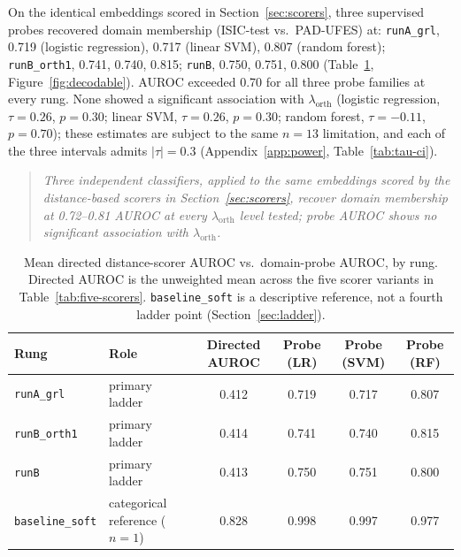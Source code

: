 On the identical embeddings scored in Section~\ref{sec:scorers}, three supervised probes recovered domain membership (ISIC-test vs.\ PAD-UFES) at: \texttt{runA\_grl}, 0.719 (logistic regression), 0.717 (linear SVM), 0.807 (random forest); \texttt{runB\_orth1}, 0.741, 0.740, 0.815; \texttt{runB}, 0.750, 0.751, 0.800 (Table~\ref{tab:probe-vs-distance}, Figure~\ref{fig:decodable}). AUROC exceeded 0.70 for all three probe families at every rung. None showed a significant association with $\lambda_{\mathrm{orth}}$ (logistic regression, $\tau = 0.26$, $p = 0.30$; linear SVM, $\tau = 0.26$, $p = 0.30$; random forest, $\tau = -0.11$, $p = 0.70$); these estimates are subject to the same $n = 13$ limitation, and each of the three intervals admits $|\tau| = 0.3$ (Appendix~\ref{app:power}, Table~\ref{tab:tau-ci}).

\begin{quote}
\emph{Three independent classifiers, applied to the same embeddings scored by the distance-based scorers in Section~\ref{sec:scorers}, recover domain membership at 0.72--0.81 AUROC at every $\lambda_{\mathrm{orth}}$ level tested; probe AUROC shows no significant association with $\lambda_{\mathrm{orth}}$.}
\end{quote}

\begin{table}[t]
\centering
\caption{Mean directed distance-scorer AUROC vs.\ domain-probe AUROC, by rung. Directed AUROC is the unweighted mean across the five scorer variants in Table~\ref{tab:five-scorers}. \texttt{baseline\_soft} is a descriptive reference, not a fourth ladder point (Section~\ref{sec:ladder}).}
\label{tab:probe-vs-distance}
\small
\begin{tabular}{llcccc}
\toprule
Rung & Role & Directed AUROC & Probe (LR) & Probe (SVM) & Probe (RF) \\
\midrule
\texttt{runA\_grl} & primary ladder & 0.412 & 0.719 & 0.717 & 0.807 \\
\texttt{runB\_orth1} & primary ladder & 0.414 & 0.741 & 0.740 & 0.815 \\
\texttt{runB} & primary ladder & 0.413 & 0.750 & 0.751 & 0.800 \\
\texttt{baseline\_soft} & categorical reference ($n=1$) & 0.828 & 0.998 & 0.997 & 0.977 \\
\bottomrule
\end{tabular}
\end{table}

